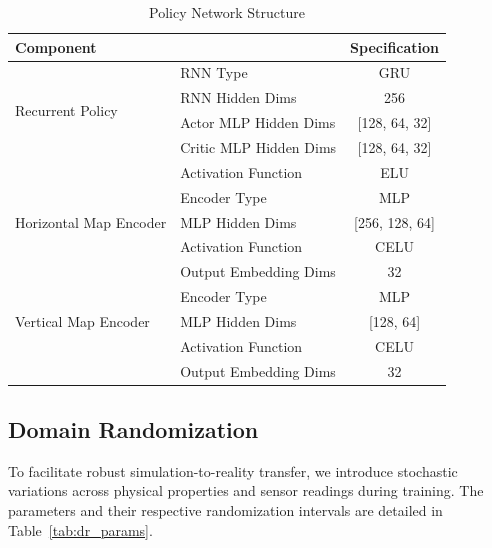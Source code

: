 \begin{table}[h!]
\centering
\caption{Policy Network Structure}
\label{tab:network_structure}
\begin{tabular}{l|l|c}
\toprule
\multicolumn{2}{l|}{\textbf{Component}} & \textbf{Specification} \\
\midrule
\multirow{4}{*}{Recurrent Policy} & RNN Type & GRU \\
                           & RNN Hidden Dims & 256 \\
                           & Actor MLP Hidden Dims & [128, 64, 32] \\
                           & Critic MLP Hidden Dims & [128, 64, 32] \\
                           & Activation Function & ELU \\
\midrule
\multirow{3}{*}{Horizontal Map Encoder} & Encoder Type & MLP \\
                                 & MLP Hidden Dims & [256, 128, 64] \\
                                 & Activation Function & CELU \\
                                 & Output Embedding Dims & 32 \\
\midrule
\multirow{3}{*}{Vertical Map Encoder} & Encoder Type & MLP \\
                                 & MLP Hidden Dims & [128, 64] \\
                                 & Activation Function & CELU \\
                                 & Output Embedding Dims & 32 \\
\bottomrule
\end{tabular}
\end{table}

\subsection{Domain Randomization}
To facilitate robust simulation-to-reality transfer, we introduce stochastic variations across physical properties and sensor readings during training. The parameters and their respective randomization intervals are detailed in Table~\ref{tab:dr_params}.

